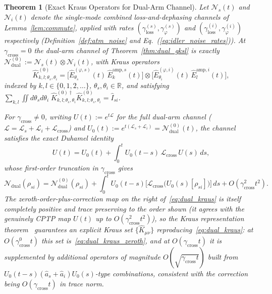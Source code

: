 \documentclass[journal]{IEEEtran}
\newtheorem{theorem}{Theorem}
\begin{document}
\begin{theorem}[Exact Kraus Operators for Dual-Arm Channel]\label{thm:dual_kraus}
Let $\mathcal N_s(t)$ and $\mathcal N_i(t)$ denote the single-mode combined loss-and-dephasing channels of Lemma~\ref{lem:commute}, applied with rates $(\gamma_{\text{loss}}^{(s)},\gamma_\varphi^{(s)})$ and $(\gamma_{\text{loss}}^{(i)},\gamma_\varphi^{(i)})$ respectively (Definition~\ref{def:atm_noise} and Eq.~(\ref{eq:idler_noise_rates})). At $\gamma_{\text{cross}}=0$ the dual-arm channel of Theorem~\ref{thm:dual_gksl} is \emph{exactly} $\mathcal N_{\text{dual}}^{(0)}:=\mathcal N_s(t)\otimes\mathcal N_i(t)$, with Kraus operators
\begin{equation}\label{eq:dual_kraus_zeroth}
\hat K^{(0)}_{k,l;\theta_s,\theta_i} = \Big[\hat E_{\theta_s}^{(\varphi,s)}(t)\,\hat E_k^{\text{amp},s}(t)\Big]\otimes\Big[\hat E_{\theta_i}^{(\varphi,i)}(t)\,\hat E_l^{\text{amp},i}(t)\Big],
\end{equation}
indexed by $k,l\in\{0,1,2,\dots\}$, $\theta_s,\theta_i\in\mathbb R$, and satisfying $\sum_{k,l}\iint d\theta_sd\theta_i\;\hat K^{(0)\dagger}_{k,l;\theta_s,\theta_i}\hat K^{(0)}_{k,l;\theta_s,\theta_i}=\hat I_{si}$.

For $\gamma_{\text{cross}}\neq0$, writing $U(t):=e^{t\mathcal L}$ for the full dual-arm channel ($\mathcal L=\mathcal L_s+\mathcal L_i+\mathcal L_{\text{cross}}$) and $U_0(t):=e^{t(\mathcal L_s+\mathcal L_i)}=\mathcal N_{\text{dual}}^{(0)}(t)$, the channel satisfies the \emph{exact} Duhamel identity
\begin{equation}\label{eq:duhamel_exact}
U(t) = U_0(t) + \int_0^t U_0(t-s)\,\mathcal L_{\text{cross}}\,U(s)\,ds,
\end{equation}
whose first-order truncation in $\gamma_{\text{cross}}$ gives
\begin{equation}\label{eq:dual_kraus}
\mathcal{N}_{\text{dual}}(\rho_{si}) = \mathcal N_{\text{dual}}^{(0)}(\rho_{si}) + \int_0^t U_0(t-s)\big[\mathcal L_{\text{cross}}\big(U_0(s)[\rho_{si}]\big)\big]\,ds + O(\gamma_{\text{cross}}^2t^2).
\end{equation}
The zeroth-order-plus-correction map on the right of~\eqref{eq:dual_kraus} is itself completely positive and trace preserving to the order shown (it agrees with the genuinely CPTP map $U(t)$ up to $O(\gamma_{\text{cross}}^2t^2)$), so the Kraus representation theorem~\cite[Sec.~8.2]{breuer2002theory} guarantees an explicit Kraus set $\{\hat K_{\mu\nu}\}$ reproducing~\eqref{eq:dual_kraus}: at $O(\gamma_{\text{cross}}^0t)$ this set is~\eqref{eq:dual_kraus_zeroth}, and at $O(\gamma_{\text{cross}}t)$ it is supplemented by additional operators of magnitude $O(\sqrt{\gamma_{\text{cross}}t})$ built from $U_0(t-s)(\hat a_s{+}\hat a_i)U_0(s)$-type combinations, consistent with the correction being $O(\gamma_{\text{cross}}t)$ in trace norm.
\end{theorem}
\end{document}
